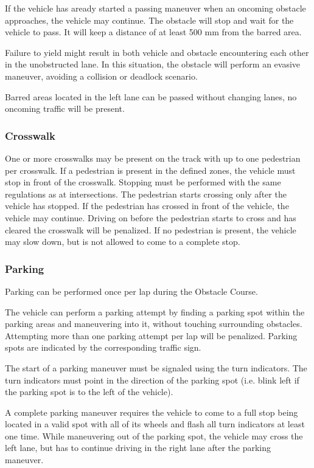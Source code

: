 	If the vehicle has aready started a passing maneuver when an oncoming obstacle approaches, the vehicle may continue.
	The obstacle will stop and wait for the vehicle to pass.
	It will keep a distance of at least 500 mm from the barred area.

	Failure to yield might result in both vehicle and obstacle encountering each other in the unobstructed lane.
	In this situation, the obstacle will perform an evasive maneuver, avoiding a collision or deadlock scenario.

Barred areas located in the left lane can be passed without changing lanes, no oncoming traffic will be present.

\subsubsection{Crosswalk}

One or more crosswalks may be present on the track with up to one pedestrian per crosswalk.
If a pedestrian is present in the defined zones, the vehicle must stop in front of the crosswalk.
Stopping must be performed with the same regulations as at intersections.
The pedestrian starts crossing only after the vehicle has stopped.
If the pedestrian has crossed in front of the vehicle, the vehicle may continue.
Driving on before the pedestrian starts to cross and has cleared the crosswalk will be penalized.
If no pedestrian is present, the vehicle may slow down, but is not allowed to come to a complete stop.

\subsubsection{Parking}

Parking can be performed once per lap during the Obstacle Course.

The vehicle can perform a parking attempt by finding a parking spot within the parking areas and maneuvering into it, without touching surrounding obstacles.
Attempting more than one parking attempt per lap will be penalized.
Parking spots are indicated by the corresponding traffic sign.

The start of a parking maneuver must be signaled using the turn indicators.
The turn indicators must point in the direction of the parking spot (i.e. blink left if the parking spot is to the left of the vehicle).

A complete parking maneuver requires the vehicle to come to a full stop being located in a valid spot with all of its wheels and flash all turn indicators at least one time.
While maneuvering out of the parking spot, the vehicle may cross the left lane, but has to continue driving in the right lane after the parking maneuver.

